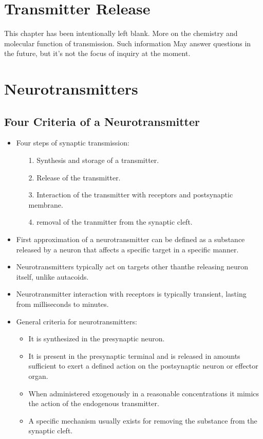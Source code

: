 \documentclass[12pt,a4paper]{article}
\begin{document}
\clearpage
\section{Transmitter Release}
    This chapter has been intentionally left blank. More on the chemistry and molecular function of transmission. Such information May answer questions in the future, but it's not the focus of inquiry at the moment. 

\clearpage
\section{Neurotransmitters}
\subsection{Four Criteria of a Neurotransmitter}   
\begin{itemize}
    \item Four steps of synaptic transmission: 
        \begin{itemize}
            \item[1.] Synthesis and storage of a transmitter.
            \item[2.] Release of the transmitter.
            \item[3.] Interaction of the transmitter with receptors and postsynaptic membrane.
            \item[4.] removal of the tranmitter from the synaptic cleft.
        \end{itemize}
    \item First approximation of a neurotransmitter can be defined as a substance released by a neuron that affects a specific target in a specific manner.
    \item Neurotransmitters typically act on targets other thanthe releasing neuron itself, unlike autacoids.
    \item Neurotransmitter interaction with receptors is typically transient, lasting from milliseconds to minutes.
    \item General criteria for neurotransmitters:
        \begin{itemize}
            \item It is synthesized in the presynaptic neuron.
            \item It is present in the presynaptic terminal and is released in amounts sufficient to exert a defined action on the postsynaptic neuron or effector organ.
            \item When administered exogenously in a reasonable concentrations it mimics the action of the endogenous transmitter.
            \item A specific mechanism usually exists for removing the substance from the synaptic cleft.
        \end{itemize}
\end{itemize}
\end{document}
